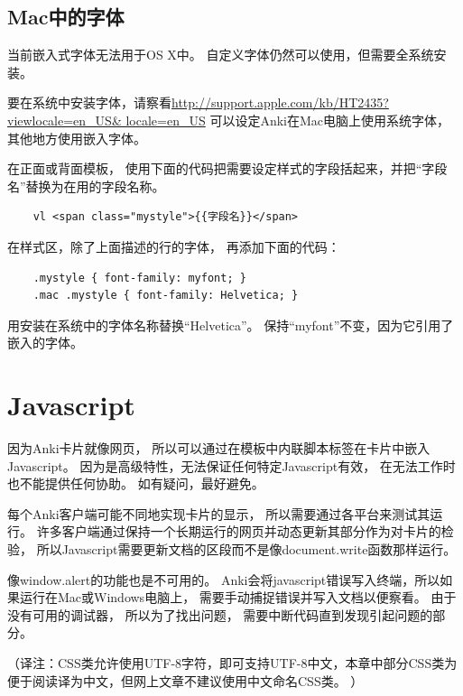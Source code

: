 \documentclass[a4paper]{book}
\begin{document}
\subsection{Mac中的字体}

当前嵌入式字体无法用于OS X中。 自定义字体仍然可以使用，但需要全系统安装。

要在系统中安装字体，请察看\url{http://support.apple.com/kb/HT2435?viewlocale=en_US\& locale=en_US}
可以设定Anki在Mac电脑上使用系统字体， 其他地方使用嵌入字体。

在正面或背面模板， 使用下面的代码把需要设定样式的字段括起来，并把“字段名”替换为在用的字段名称。

\begin{shaded}\begin{verbatim}
	vl <span class="mystyle">{{字段名}}</span>
	\end{verbatim}\end{shaded}

在样式区，除了上面描述的行的字体， 再添加下面的代码：

\begin{shaded}\begin{verbatim}
	.mystyle { font-family: myfont; }
	.mac .mystyle { font-family: Helvetica; }
	\end{verbatim}\end{shaded}

用安装在系统中的字体名称替换“Helvetica”。 保持“myfont”不变，因为它引用了嵌入的字体。

\section{Javascript}

因为Anki卡片就像网页， 所以可以通过在模板中内联脚本标签在卡片中嵌入Javascript。 因为是高级特性，无法保证任何特定Javascript有效， 在无法工作时也不能提供任何协助。 如有疑问，最好避免。

每个Anki客户端可能不同地实现卡片的显示， 所以需要通过各平台来测试其运行。 许多客户端通过保持一个长期运行的网页并动态更新其部分作为对卡片的检验， 所以Javascript需要更新文档的区段而不是像document.write函数那样运行。

像window.alert的功能也是不可用的。 Anki会将javascript错误写入终端，所以如果运行在Mac或Windows电脑上， 需要手动捕捉错误并写入文档以便察看。 由于没有可用的调试器， 所以为了找出问题， 需要中断代码直到发现引起问题的部分。

（译注：CSS类允许使用UTF-8字符，即可支持UTF-8中文，本章中部分CSS类为便于阅读译为中文，但网上文章不建议使用中文命名CSS类。 ）
\end{document}
